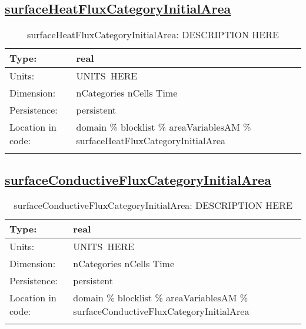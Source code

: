 \subsection[surfaceHeatFluxCategoryInitialArea]{\hyperref[sec:var_tab_areaVariablesAM]{surfaceHeatFluxCategoryInitialArea}}
\label{subsec:var_sec_areaVariablesAM_surfaceHeatFluxCategoryInitialArea}
\begin{center}
\begin{longtable}{| p{2.0in} | p{4.0in} |}
        \hline 
        Type: & real \\
        \hline 
        Units: & \si{UNITS.HERE} \\
        \hline 
        Dimension: & nCategories nCells Time \\
        \hline 
        Persistence: & persistent \\
        \hline 
         Location in code: & domain \% blocklist \% areaVariablesAM \% surfaceHeatFluxCategoryInitialArea \\
         \hline 
    \caption{surfaceHeatFluxCategoryInitialArea: DESCRIPTION HERE}
\end{longtable}
\end{center}
\subsection[surfaceConductiveFluxCategoryInitialArea]{\hyperref[sec:var_tab_areaVariablesAM]{surfaceConductiveFluxCategoryInitialArea}}
\label{subsec:var_sec_areaVariablesAM_surfaceConductiveFluxCategoryInitialArea}
\begin{center}
\begin{longtable}{| p{2.0in} | p{4.0in} |}
        \hline 
        Type: & real \\
        \hline 
        Units: & \si{UNITS.HERE} \\
        \hline 
        Dimension: & nCategories nCells Time \\
        \hline 
        Persistence: & persistent \\
        \hline 
         Location in code: & domain \% blocklist \% areaVariablesAM \% surfaceConductiveFluxCategoryInitialArea \\
         \hline 
    \caption{surfaceConductiveFluxCategoryInitialArea: DESCRIPTION HERE}
\end{longtable}
\end{center}
